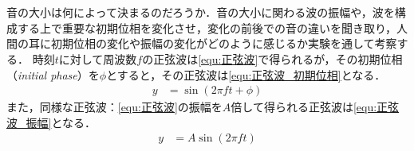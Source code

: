\section{\kadaiab}\label{sec:\kadaiab}
\purpose
音の大小は何によって決まるのだろうか．音の大小に関わる波の振幅や，波を構成する上で重要な初期位相を変化させ，変化の前後での音の違いを聞き取り，人間の耳に初期位相の変化や振幅の変化がどのように感じるか実験を通して考察する．
\method
時刻\(t\)に対して周波数\(f\)の正弦波は\eqref{equ:正弦波}で得られるが，その初期位相（\textit{initial phase}）を\(\phi\)とすると，その正弦波は\eqref{equ:正弦波_初期位相}となる．
\begin{align}
    y & =\sin(2\pi ft+\phi)\label{equ:正弦波_初期位相}
\end{align}また，同様な正弦波：\eqref{equ:正弦波}の振幅を\(A\)倍して得られる正弦波は\eqref{equ:正弦波_振幅}となる．
\begin{align}
    y & =A\sin(2\pi ft)\label{equ:正弦波_振幅}
\end{align}
